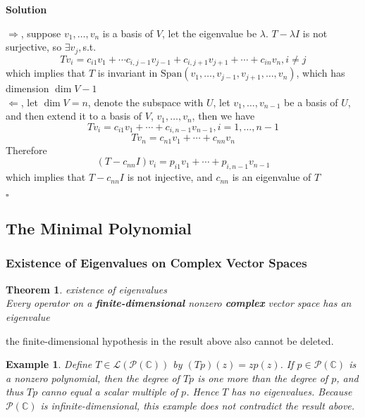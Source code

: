 \documentclass{article}
\newtheorem{theorem}{Theorem}[subsection]
\newtheorem{example}{Example}[subsection]
\newenvironment{solution}{%
{
    \textbf{Solution\\}
    }
}{
  \hfill $\square$ 
  \par\bigskip 
}
\newcommand{\CC}{\mathbb{C}}
\newcommand{\spans}{\text{Span}}
\begin{document}
\begin{CJK}{UTF8}{gkai}
\begin{solution}
    $\Rightarrow$, suppose $v_1, \ldots, v_n$ is a basis of $V$, let the eigenvalue be $\lambda$. $T - \lambda I$ is not surjective, so $\exists v_j , $s.t.\\
    \[Tv_i = c_{i1} v_1 + \cdots c_{i, j - 1} v_{j - 1} + c_{i,j + 1} v_{j + 1} + \cdots + c_{in} v_n , i \neq j\]
    which implies that $T$ is invariant in $\spans (v_1,\ldots,v_{j - 1}, v_{j + 1},\ldots,v_n)$, which has dimension $\dim V - 1$\\

    $\Leftarrow$, let $\dim V = n$, denote the subspace with $U$, let $v_1,\ldots,v_{n - 1}$ be a basis of $U$, and then extend it to a basis of $V$, $v_1,\ldots , v_n$, then we have 
    \[Tv_i = c_{i1} v_1 + \cdots + c_{i,n -1} v_{n - 1}, i = 1,\ldots, n - 1\]
    \[Tv_n = c_{n1} v_1 + \cdots + c_{nn} v_n\]
    Therefore
    \[(T - c_{nn} I) v_i = p_{i1} v_1 + \cdots + p_{i,n - 1} v_{n - 1}\]
    which implies that $T - c_{nn} I$ is not injective, and $c_{nn}$ is an eigenvalue of $T$
\end{solution}

\subsection{The Minimal Polynomial}
\subsubsection{Existence of Eigenvalues on Complex Vector Spaces}

\begin{theorem}
    existence of eigenvalues\\

    Every operator on a \textbf{finite-dimensional} nonzero \textbf{complex} vector space has an eigenvalue
\end{theorem}

the finite-dimensional hypothesis in the result above also cannot be deleted.
\begin{example}
    
    Define $T \in \mathcal{L}(\mathcal{P}(\CC))$ by $(Tp)(z) = zp(z)$. If $p \in \mathcal{P}(\CC)$ is a nonzero polynomial, then the degree of $Tp$ is one more than the degree of $p$, and thus $Tp$ canno equal a scalar multiple of $p$. Hence $T$ has no eigenvalues. Because $\mathcal{P}(\CC)$ is infinite-dimensional, this example does not contradict the result above.
 
\end{example}


\end{CJK}
\end{document}
